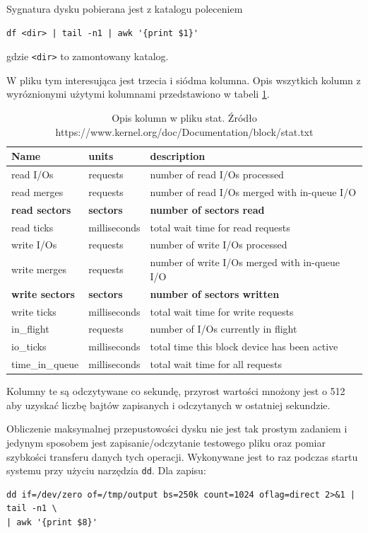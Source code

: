 Sygnatura dysku pobierana jest z katalogu poleceniem
\begin{verbatim}
df <dir> | tail -n1 | awk '{print $1}'
\end{verbatim}

gdzie \texttt{<dir>} to zamontowany katalog.

W pliku tym interesująca jest trzecia i siódma kolumna. Opis wszytkich kolumn
z wyróznionymi użytymi kolumnami przedstawiono
w tabeli \ref{tab:stat}.

\begin{table}
\caption{Opis kolumn w pliku stat. \newline Źródło https://www.kernel.org/doc/Documentation/block/stat.txt}
\label{tab:stat}
\def\arraystretch{1.5}%
\begin{tabular}{|l|l|l|}
\hline
\textbf{Name} & \textbf{units} & \textbf{description}\\ \hline
\hline
read I/Os & requests & number of read I/Os processed\\ \hline
read merges & requests & number of read I/Os merged with in-queue I/O\\ \hline
\textbf{read sectors} & \textbf{sectors} & \textbf{number of sectors read}\\ \hline
read ticks & milliseconds & total wait time for read requests\\ \hline
write I/Os & requests & number of write I/Os processed\\ \hline
write merges & requests & number of write I/Os merged with in-queue I/O\\ \hline
\textbf{write sectors} & \textbf{sectors} & \textbf{number of sectors written}\\ \hline
write ticks & milliseconds & total wait time for write requests\\ \hline
in\_flight & requests & number of I/Os currently in flight\\ \hline
io\_ticks  & milliseconds & total time this block device has been active\\ \hline
time\_in\_queue & milliseconds & total wait time for all requests\\
\hline
\end{tabular}
\end{table}

Kolumny te są odczytywane co sekundę, przyrost wartości mnożony jest o 512 aby uzyskać
liczbę bajtów zapisanych i odczytanych w ostatniej sekundzie.

Obliczenie maksymalnej przepustowości dysku nie jest tak prostym zadaniem i jedynym
sposobem jest zapisanie/odczytanie testowego pliku oraz pomiar szybkości transferu danych tych operacji.
Wykonywane jest to raz podczas startu systemu przy użyciu narzędzia \texttt{dd}. Dla zapisu:
\begin{verbatim}
dd if=/dev/zero of=/tmp/output bs=250k count=1024 oflag=direct 2>&1 | tail -n1 \
| awk '{print $8}'
\end{verbatim}

